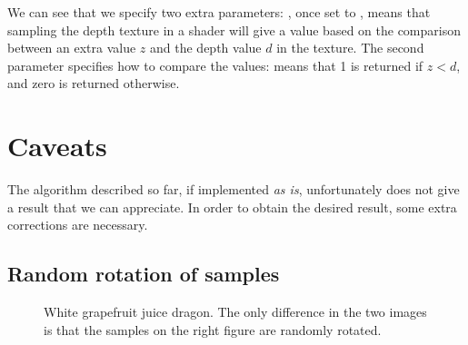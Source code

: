 We can see that we specify two extra parameters: , once set to , means that sampling the depth texture in a shader will give a value based on the comparison between an extra value $z$ and the depth value $d$ in the texture. The second parameter  specifies how to compare the values:  means that 1 is returned if $z<d$, and zero is returned otherwise. 

\section{Caveats}
The algorithm described so far, if implemented \emph{as is}, unfortunately does not give a result that we can appreciate. In order to obtain the desired result, some extra corrections are necessary.

\subsection{Random rotation of samples}

\begin{figure}
\centering
{} 
\caption{White grapefruit juice dragon. The only difference in the two images is that the samples on the right figure are randomly rotated.}
\label{fig:banding}
\end{figure}

